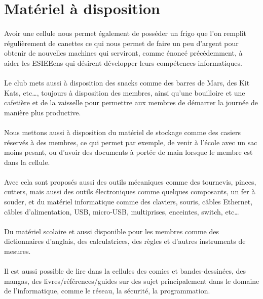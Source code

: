 \documentclass[11pt]{report}
\begin{document}
\section{Matériel à disposition}

\paragraph{} Avoir une cellule nous permet également de posséder un frigo que
l'on remplit régulièrement de canettes ce qui nous permet de faire un peu
d'argent pour obtenir de nouvelles machines qui serviront, comme énoncé
précédemment, à aider les ESIEEens qui désirent développer leurs compétences
informatiques.

\paragraph{} Le club mets aussi à disposition des snacks comme des barres de
Mars, des Kit Kats, etc\ldots, toujours à disposition des membres, ainsi qu'une
bouilloire et une cafetière et de la vaisselle pour permettre aux membres de
démarrer la journée de manière plus productive.

\paragraph{} Nous mettons aussi à disposition du matériel de stockage comme des
casiers réservés à des membres, ce qui permet par exemple, de venir à l'école
avec un sac moins pesant, ou d'avoir des documents à portée de main lorsque le
membre est dans la cellule.

\paragraph{} Avec cela sont proposés aussi des outils mécaniques comme des
tournevis, pinces, cutters, mais aussi des outils électroniques comme quelques
composants, un fer à souder, et du matériel informatique comme des claviers,
souris, câbles Ethernet, câbles d'alimentation, USB, micro-USB, multiprises,
enceintes, switch, etc\ldots

\paragraph{} Du matériel scolaire et aussi disponible pour les membres comme
des dictionnaires d'anglais, des calculatrices, des règles et d'autres
instruments de mesures.

\paragraph{} Il est aussi possible de lire dans la cellules des comics et
bandes-dessinées, des mangas, des livres/références/guides sur des sujet
principalement dans le domaine de l'informatique, comme le réseau, la sécurité,
la programmation.
\end{document}
